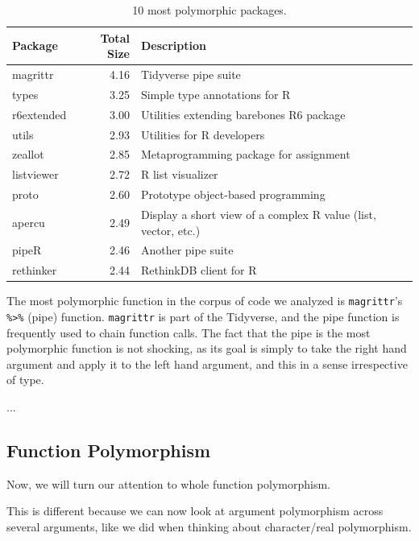 \documentclass[acmsmall,10pt,review,anonymous]{acmart}\settopmatter{printfolios=true,printccs=false,printacmref=false}
\begin{document}
\begin{table}[ht]
\label{tab:packagepolysize}
\centering
\begin{tabular}{lrl}
  \hline
Package & Total Size & Description \\ 
  \hline
  magrittr & 4.16 & Tidyverse pipe suite \\ 
  types & 3.25 & Simple type annotations for R \\ 
  r6extended & 3.00 & Utilities extending barebones R6 package \\ 
  utils & 2.93 & Utilities for R developers \\ 
  zeallot & 2.85 & Metaprogramming package for assignment \\ 
  listviewer & 2.72 & R list visualizer \\ 
  proto & 2.60 & Prototype object-based programming \\ 
  apercu & 2.49 & Display a short view of a complex R value (list, vector, etc.) \\ 
  pipeR & 2.46 & Another pipe suite \\ 
  rethinker & 2.44 & RethinkDB client for R \\ 
   \hline
\end{tabular}
\caption{10 most polymorphic packages.}
\end{table}




The most polymorphic function in the corpus of code we analyzed is {\tt magrittr}'s {\tt \%>\%} (pipe) function.
{\tt magrittr} is part of the Tidyverse, and the pipe function is frequently used to chain function calls.
The fact that the pipe is the most polymorphic function is not shocking, as its goal is simply to take the right hand argument and apply it to the left hand argument, and this in a sense irrespective of type.

...

%
%
%
%
\subsection{Function Polymorphism}

Now, we will turn our attention to whole function polymorphism.

This is different because we can now look at argument polymorphism across several arguments, like we did when thinking about character/real polymorphism.
\end{document}
